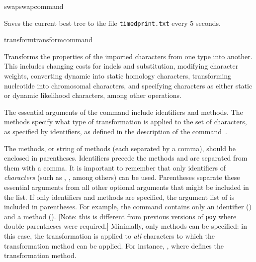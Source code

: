 \begin{command}{swap}{swapcommand}
\begin{poyexamples}
{Saves the current best tree to the file \texttt{timedprint.txt} every 5 seconds.}

\end{poyexamples}

\begin{poyalso}
\end{poyalso} 

\end{command}


\begin{command}{transform}{transformcommand}


\begin{poydescription} 
Transforms the properties of the imported characters from one type into
another. This includes changing costs for indels and substitution,
modifying character weights, converting dynamic into static homology characters,
transforming nucleotide into chromosomal characters, and specifying characters as either 
static or dynamic likelihood characters, among other operations.

The essential arguments of the command  
include identifiers and methods. The methods
specify what type of transformation is applied to the set of characters,
as specified by identifiers, as defined in the description of the command~.


The methods, or string of methods (each separated by a comma), should be enclosed in 
parentheses. Identifiers precede the methods and are separated from them with a comma.
It is important to remember that only identifiers of \emph{characters} 
(such as , , among
others) can be used. Parentheses separate these essential arguments from all other 
optional arguments that might be included
in the list. If only identifiers and methods are specified,
the argument list of  is included in 
parentheses. For example, the command  
contains only an identifier () and a
method (). [Note: this is different from previous versions of \texttt{poy} 
where double parentheses were required.] Minimally, only methods can be
specified: in this case, the transformation is applied to \emph{all}
characters to which the transformation method can be applied. For instance,
, where
 defines
the transformation method.


\end{poydescription}
\end{command}
